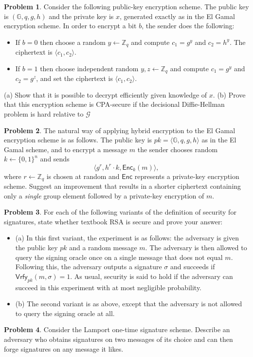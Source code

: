 \documentclass[11pt]{article}
\theoremstyle{definition}
\newtheorem{problem}{Problem}
\begin{document}
\begin{problem}
Consider the following public-key encryption scheme. The public key is $(\mathbb{G},q,g,h)$ and the private key is $x$, generated exactly as in the El Gamal encryption scheme. In order to encrypt a bit $b$, the sender does the following:
\begin{itemize}
\item If $b=0$ then choose a random $y \gets \mathbb{Z}_q$ and compute $c_1= g^y$ and $c_2=h^y$. The ciphertext is $\langle c_1,c_2\rangle$.
\item If $b=1$ then choose independent random $y,z \gets \mathbb{Z}_q$ and compute $c_1= g^y$ and $c_2=g^z$, and set the ciphertext is $\langle c_1,c_2\rangle$.
\end{itemize}
(a) Show that it is possible to decrypt efficiently given knowledge of $x$. (b) Prove that this encryption scheme is CPA-secure if the decisional Diffie-Hellman problem is hard relative to $\mathcal{G}$
\end{problem}

\begin{problem}
The natural way of applying hybrid encryption to the El Gamal encryption scheme is as follows. The public key is $pk = \langle \mathbb{G},q,g,h\rangle $ as in the El Gamal scheme, and to encrypt a message $m$ the sender chooses random $k \gets \{0,1\}^n$ and sends
\[ \langle g^r, h^r\cdot k, \mathsf{Enc}_k(m)\rangle, \]
where $r\gets \mathbb{Z}_q$ is chosen at random and $\mathsf{Enc}$ represents a private-key encryption scheme. Suggest an improvement that results in a shorter ciphertext containing only a \emph{single} group element followed by a private-key encryption of $m$.
\end{problem}

\begin{problem}
For each of the following variants of the definition of security for signatures, state whether textbook RSA is secure and prove your answer: 
\begin{itemize}
\item (a) In this first variant, the experiment is as follows: the adversary is given the public key $pk$ and a random message $m$. The adversary is then allowed to query the signing oracle once on a single message that does not equal $m$. Following this, the adversary outputs a signature $\sigma$ and succeeds if $\mathsf{Vrfy}_{pk}(m,\sigma)=1$. As usual, security is said to hold if the adversary can succeed in this experiment with at most negligible probability.	
\item (b) The second variant is as above, except that the adversary is not allowed to query the signing oracle at all.
\end{itemize}
\end{problem}

\begin{problem}
Consider the Lamport one-time signature scheme. Describe an adversary who obtains signatures on two messages of its choice and can then forge signatures on any message it likes.
\end{problem}
\end{document}
